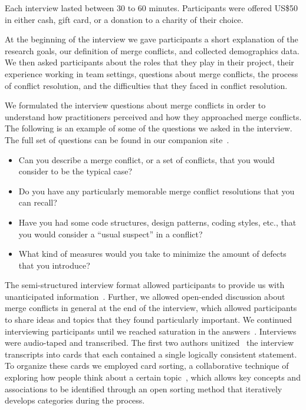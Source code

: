
Each interview lasted between 30 to 60 minutes. Participants were offered US\$50 in either cash, gift card, or a donation to a charity of their choice.

At the beginning of the interview we gave participants a short explanation of the research goals, our definition of merge conflicts, and collected demographics data. 
We then asked participants about the roles that they play in their project, their experience working in team settings,  questions about merge conflicts, the process of conflict resolution, and the difficulties that they faced in conflict resolution.

We formulated the interview questions about merge conflicts in order to understand how practitioners perceived and how they approached merge conflicts.
The following is an example of some of the questions we asked in the interview. The full set of questions can be found in our companion site~\cite{companion_site}.
\begin{itemize}
	\item Can you describe a merge conflict, or a set of conflicts, that you would consider to be the typical case?
	\item Do you have any particularly memorable merge conflict resolutions that you can recall?
	\item Have you had some code structures, design patterns, coding styles, etc., that you would consider a ``usual suspect'' in a conflict?
	\item What kind of measures would you take to minimize the amount of defects that you introduce?
\end{itemize}

The semi-structured interview format allowed participants to provide us with unanticipated information~\cite{seaman2008qualitative}. 
Further, we allowed open-ended discussion about merge conflicts in general at the end of the interview, which allowed participants to share ideas and topics that they found particularly important. 
We continued interviewing participants until we reached saturation in the answers~\cite{fusch2015we}.
 Interviews were audio-taped and transcribed. 
The first two authors unitized~\cite{unitization} the interview transcripts into cards that each contained a single logically consistent statement. 
To organize these cards we employed card sorting, a collaborative technique of exploring how people think about a certain topic~\cite{spencer2009card}\cite{card_sort}, which allows key concepts and associations to be identified through an open sorting method that iteratively develops categories during the process.


